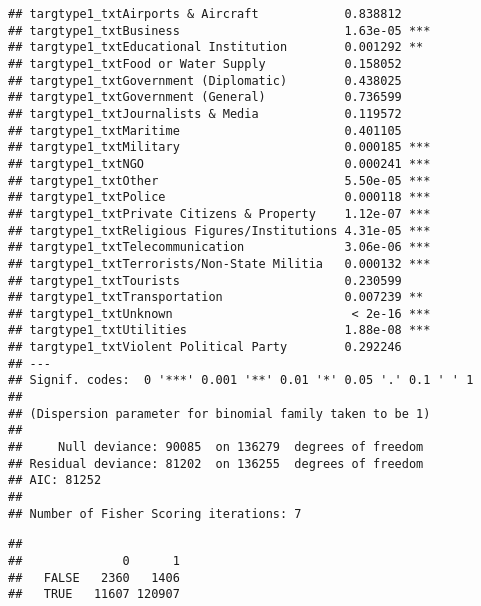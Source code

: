\documentclass[11pt,letterpaper,]{article}
\newenvironment{Shaded}{\begin{snugshade}}{\end{snugshade}}
\newcommand{\KeywordTok}[1]{\textcolor[rgb]{0.13,0.29,0.53}{\textbf{{#1}}}}
\newcommand{\DataTypeTok}[1]{\textcolor[rgb]{0.13,0.29,0.53}{{#1}}}
\newcommand{\FloatTok}[1]{\textcolor[rgb]{0.00,0.00,0.81}{{#1}}}
\newcommand{\StringTok}[1]{\textcolor[rgb]{0.31,0.60,0.02}{{#1}}}
\newcommand{\CommentTok}[1]{\textcolor[rgb]{0.56,0.35,0.01}{\textit{{#1}}}}
\newcommand{\NormalTok}[1]{{#1}}
\theoremstyle{definition}
\theoremstyle{definition}
\theoremstyle{definition}
\theoremstyle{remark}
\begin{document}
\begin{verbatim}
## targtype1_txtAirports & Aircraft            0.838812    
## targtype1_txtBusiness                       1.63e-05 ***
## targtype1_txtEducational Institution        0.001292 ** 
## targtype1_txtFood or Water Supply           0.158052    
## targtype1_txtGovernment (Diplomatic)        0.438025    
## targtype1_txtGovernment (General)           0.736599    
## targtype1_txtJournalists & Media            0.119572    
## targtype1_txtMaritime                       0.401105    
## targtype1_txtMilitary                       0.000185 ***
## targtype1_txtNGO                            0.000241 ***
## targtype1_txtOther                          5.50e-05 ***
## targtype1_txtPolice                         0.000118 ***
## targtype1_txtPrivate Citizens & Property    1.12e-07 ***
## targtype1_txtReligious Figures/Institutions 4.31e-05 ***
## targtype1_txtTelecommunication              3.06e-06 ***
## targtype1_txtTerrorists/Non-State Militia   0.000132 ***
## targtype1_txtTourists                       0.230599    
## targtype1_txtTransportation                 0.007239 ** 
## targtype1_txtUnknown                         < 2e-16 ***
## targtype1_txtUtilities                      1.88e-08 ***
## targtype1_txtViolent Political Party        0.292246    
## ---
## Signif. codes:  0 '***' 0.001 '**' 0.01 '*' 0.05 '.' 0.1 ' ' 1
## 
## (Dispersion parameter for binomial family taken to be 1)
## 
##     Null deviance: 90085  on 136279  degrees of freedom
## Residual deviance: 81202  on 136255  degrees of freedom
## AIC: 81252
## 
## Number of Fisher Scoring iterations: 7
\end{verbatim}

\begin{Shaded}
\end{Shaded}

\begin{verbatim}
##        
##              0      1
##   FALSE   2360   1406
##   TRUE   11607 120907
\end{verbatim}
\end{document}
